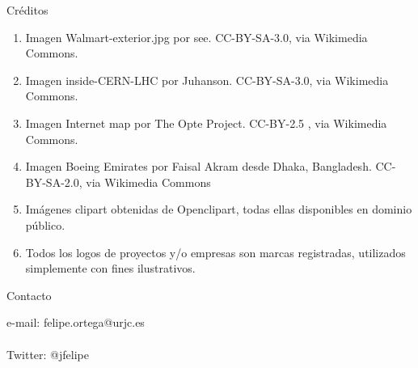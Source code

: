 
\begin{frame}{Créditos}
\begin{enumerate}
 \item Imagen Walmart-exterior.jpg por see. CC-BY-SA-3.0, via Wikimedia Commons.
 \item Imagen inside-CERN-LHC por Juhanson. CC-BY-SA-3.0, via Wikimedia Commons.
 \item Imagen Internet map por The Opte Project. CC-BY-2.5 , via Wikimedia Commons.
 \item Imagen Boeing Emirates por Faisal Akram desde Dhaka, Bangladesh. CC-BY-SA-2.0, via Wikimedia Commons
 \item Imágenes clipart obtenidas de Openclipart, todas ellas disponibles en dominio público.
 \item Todos los logos de proyectos y/o empresas son marcas registradas, utilizados simplemente con fines ilustrativos.
\end{enumerate}
\end{frame}


\begin{frame}{Contacto}
\begin{huge}
e-mail: felipe.ortega@urjc.es\\~\\
Twitter: @jfelipe
\end{huge}
\end{frame}

